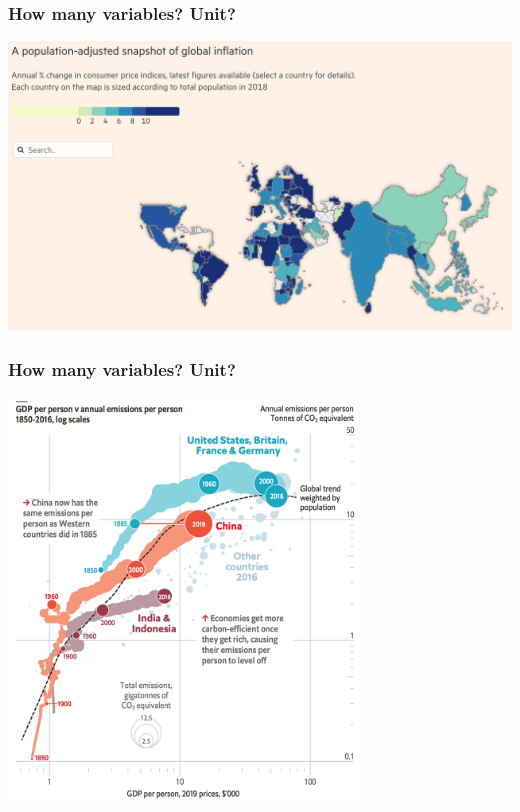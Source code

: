 \documentclass[aspectratio=43]{beamer}
\begin{document}
\begin{frame}
\frametitle{How many variables? Unit?}
\centering

\includegraphics[width = \textwidth]{../img/global_inflation_ft}

\end{frame}

\begin{frame}
\frametitle{How many variables? Unit?}
\centering

\includegraphics[width = 0.7\textwidth]{../img/emissions}

\end{frame}
\end{document}

